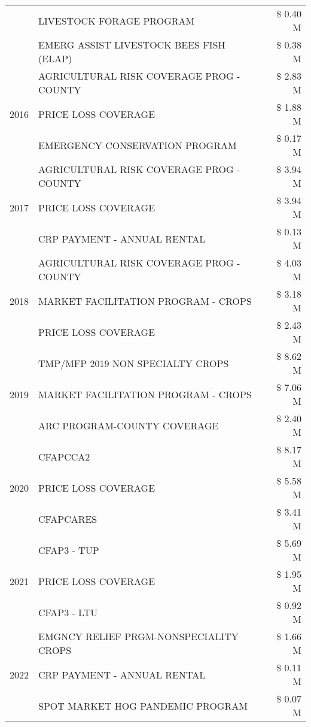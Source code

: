 \begin{tabular}{llr}
 & LIVESTOCK FORAGE PROGRAM & \$ 0.40 M \\
 & EMERG ASSIST LIVESTOCK BEES FISH (ELAP) & \$ 0.38 M \\
\cline{1-3}
\multirow[t]{3}{*}{2016} & AGRICULTURAL RISK COVERAGE PROG - COUNTY & \$ 2.83 M \\
 & PRICE LOSS COVERAGE & \$ 1.88 M \\
 & EMERGENCY CONSERVATION PROGRAM & \$ 0.17 M \\
\cline{1-3}
\multirow[t]{3}{*}{2017} & AGRICULTURAL RISK COVERAGE PROG - COUNTY & \$ 3.94 M \\
 & PRICE LOSS COVERAGE & \$ 3.94 M \\
 & CRP PAYMENT - ANNUAL RENTAL & \$ 0.13 M \\
\cline{1-3}
\multirow[t]{3}{*}{2018} & AGRICULTURAL RISK COVERAGE PROG - COUNTY & \$ 4.03 M \\
 & MARKET FACILITATION PROGRAM - CROPS & \$ 3.18 M \\
 & PRICE LOSS COVERAGE & \$ 2.43 M \\
\cline{1-3}
\multirow[t]{3}{*}{2019} & TMP/MFP 2019 NON SPECIALTY CROPS & \$ 8.62 M \\
 & MARKET FACILITATION PROGRAM - CROPS & \$ 7.06 M \\
 & ARC PROGRAM-COUNTY COVERAGE & \$ 2.40 M \\
\cline{1-3}
\multirow[t]{3}{*}{2020} & CFAPCCA2 & \$ 8.17 M \\
 & PRICE LOSS COVERAGE & \$ 5.58 M \\
 & CFAPCARES & \$ 3.41 M \\
\cline{1-3}
\multirow[t]{3}{*}{2021} & CFAP3 - TUP & \$ 5.69 M \\
 & PRICE LOSS COVERAGE & \$ 1.95 M \\
 & CFAP3 - LTU & \$ 0.92 M \\
\cline{1-3}
\multirow[t]{3}{*}{2022} & EMGNCY RELIEF PRGM-NONSPECIALITY CROPS & \$ 1.66 M \\
 & CRP PAYMENT - ANNUAL RENTAL & \$ 0.11 M \\
 & SPOT MARKET HOG PANDEMIC PROGRAM & \$ 0.07 M \\
\cline{1-3}
\bottomrule
\end{tabular}
